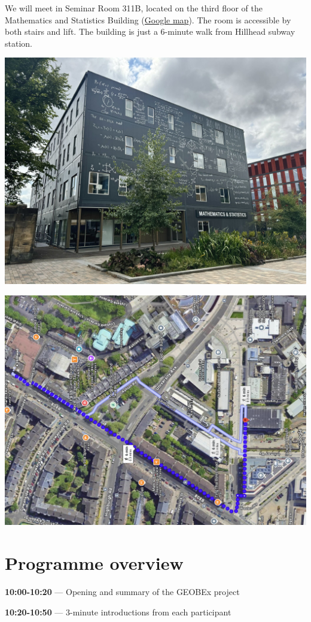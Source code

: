 \documentclass[
  11pt,
  letterpaper,
  DIV=11,
  numbers=noendperiod]{scrartcl}
\begin{document}
We will meet in Seminar Room 311B, located on the third floor of the
Mathematics and Statistics Building
(\href{https://www.google.com/maps/place/School+of+Mathematics+and+Statistics/@55.8726073,-4.2944843,871m/data=!3m2!1e3!4b1!4m6!3m5!1s0x488845cfd066d839:0xeab86bed8f92f0d0!8m2!3d55.8726073!4d-4.2944843!16s\%2Fg\%2F11ddzkn8v0?entry=ttu&g_ep=EgoyMDI1MDYwMS4wIKXMDSoASAFQAw\%3D\%3D}{Google
map}). The room is accessible by both stairs and lift. The building is
just a 6-minute walk from Hillhead subway station.

\begin{center}
\includegraphics[width=0.6\linewidth]{ms-building.jpg}
\end{center}

\begin{center}
\includegraphics[width=0.6\linewidth]{map-to-ms.png}
\end{center}

\newpage

\section{Programme overview}\label{programme-overview}

\textbf{10:00-10:20} --- Opening and summary of the GEOBEx project

\textbf{10:20-10:50} --- 3-minute introductions from each participant
\end{document}
